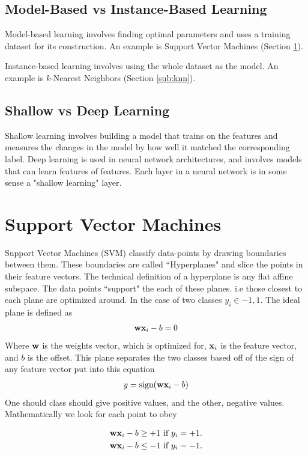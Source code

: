 \subsection{Model-Based vs Instance-Based Learning}
Model-based learning involves finding optimal parameters and uses a training dataset for its construction. An example is Support Vector Machines (Section \ref{sub:svm}).

Instance-based learning involves using the whole dataset as the model. An example is $k$-Nearest Neighbors (Section \ref{sub:knn}).

\subsection{Shallow vs Deep Learning}
Shallow learning involves building a model that trains on the features and measures the changes in the model by how well it matched the corresponding label. Deep learning is used in neural network architectures, and involves models that can learn features of features. Each layer in a neural network is in some sense a "shallow learning" layer.


\section{Support Vector Machines}\label{sub:svm}
Support Vector Machines (SVM) classify data-points by drawing boundaries between them. These boundaries are called ``Hyperplanes" and slice the points in their feature vectors. The technical definition of a hyperplane is any flat affine subspace. The data points “support" the each of these planes. i.e those closest to each plane are optimized around. In the case of two classes $y_i \in {-1,1}$. The ideal plane is defined as
\begin{align}
		\textbf{wx}_i-b =0
\end{align}
Where $\textbf{w}$ is the weights vector, which is optimized for, $\textbf{x}_i$ is the feature vector, and $b$ is the offset. This plane separates the two classes based off of the sign of any feature vector put into this equation
\begin{align}
	y = \textrm{sign}(\textbf{wx}_i-b)
\end{align}
One should class should give positive values, and the other, negative values. Mathematically we look for each point to obey

\begin{align}
	\textbf{wx}_i-b &\ge +1 ~\textrm{if}~ y_i = +1.  \label{svm_planes_pos}\\
	\textbf{wx}_i-b &\le -1 ~\textrm{if}~ y_i = -1.  \label{svm_planes_neg}
\end{align}

